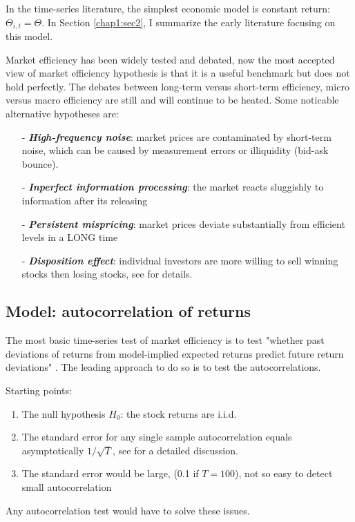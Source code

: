 In the time-series literature, the simplest economic model is constant return: $\Theta_{i,t}=\Theta$. In Section \ref{chap1:sec2}, I summarize
the early literature focusing on this model.

Market efficiency has been widely tested and debated, now the most accepted view of market efficiency hypothesis is that
it is a useful benchmark but does not hold perfectly. The debates between long-term versus short-term efficiency, micro versus
macro efficiency are still and will continue to be heated. Some noticable alternative hypotheses are:
\begin{enumerate}
    \item[-] \textbf{\textit{High-frequency noise}}: market prices are contaminated by short-term noise, which can be caused by measurement errors or illiquidity (bid-ask bounce).
    \item[-] \textbf{\textit{Inperfect information processing}}: the market reacts sluggishly to information after its releasing
    \item[-] \textbf{\textit{Persistent mispricing}}: market prices deviate substantially from efficient levels in a LONG time
    \item[-] \textbf{\textit{Disposition effect}}: individual investors are more willing to sell winning stocks then losing stocks, see \citet{shefrin1985disposition} for details.
\end{enumerate}

\subsection{Model: autocorrelation of returns}\label{chap1:sec1:ssec2}
The most basic time-series test of market efficiency is to test "whether past deviations of returns from model-implied expected returns
predict future return deviations" \citep[See][p.~124]{campbell2017financial}. The leading approach to do so is to test the autocorrelations.

Starting points:
\begin{enumerate}
    \item The null hypothesis $H_0$: the stock returns are i.i.d. 
    \item The standard error for any single sample autocorrelation equals asymptotically $1/\sqrt{T}$, see \citet{box1970distribution} for a detailed discussion.
    \item The standard error would be large, (0.1 if $T=100$), not so easy to detect small autocorrelation
\end{enumerate}
Any autocorrelation test would have to solve these issues.

